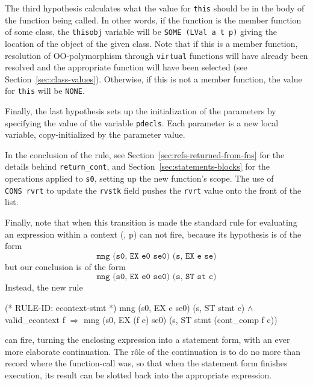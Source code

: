 \documentclass[11pt]{article}
\begin{document}
 The third hypothesis calculates what
the value for \texttt{this} should be in the
body of the function being called.  In other words, if the function is
the member function of some class, the \texttt{thisobj} variable will
be \texttt{SOME~(LVal~a~t~p)} giving the location of the object of the
given class.  Note that if this is a member function, resolution of
OO-polymorphism through \texttt{virtual} functions will have already
been resolved and the appropriate function will have been selected
(see Section~\ref{sec:class-values}).  Otherwise, if this is not a
member function, the value for \texttt{this} will be \texttt{NONE}.

Finally, the last hypothesis sets up the initialization of the
parameters by specifying the value of the variable \texttt{pdecls}.
Each parameter is a new local variable, copy-initialized by the
parameter value.

In the conclusion of the rule, see
Section~\ref{sec:refs-returned-from-fns} for the details behind
\texttt{return_cont}, and Section~\ref{sec:statements-blocks} for the
operations applied to \texttt{s0}, setting up the new function's
scope. %
%
The use of \texttt{CONS~rvrt} to update the \texttt{rvstk} field
pushes the \texttt{rvrt} value onto the front of the list.

Finally, note that when this transition is made the standard rule for
evaluating an expression within a context (,
p\pageref{rule:econtext-expr}) can not fire, because its hypothesis is
of the form
\[
\texttt{mng (s0, EX e0 se0) (s, EX e se)}
\]
but our conclusion is of the form
\[
\texttt{mng (s0, EX e0 se0) (s, ST st c)}
\]
Instead, the new rule
\label{rule:econtext-stmt}
\begin{stdrule}
(* RULE-ID: econtext-stmt *)
     mng (s0, EX e se0) (s, ST stmt c) \(\land\)
     valid_econtext f
   \(\Rightarrow\)
     mng (s0, EX (f e) se0) (s, ST stmt (cont_comp f c))
\end{stdrule}
can fire, turning the enclosing expression into a statement form, with
an ever more elaborate continuation.   The r\^ole of the continuation
is to do no more than record where the function-call was, so that when
the statement form finishes execution, its result can be slotted back
into the appropriate expression.
%
\end{document}
